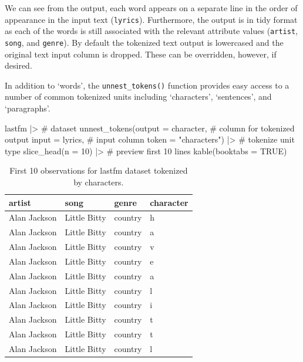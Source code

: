\documentclass[
  letterpaper,
]{latex/krantz}
\newenvironment{Shaded}{\begin{snugshade}}{\end{snugshade}}
\newcommand{\AttributeTok}[1]{\textcolor[rgb]{0.40,0.45,0.13}{#1}}
\newcommand{\CommentTok}[1]{\textcolor[rgb]{0.37,0.37,0.37}{#1}}
\newcommand{\ConstantTok}[1]{\textcolor[rgb]{0.56,0.35,0.01}{#1}}
\newcommand{\DecValTok}[1]{\textcolor[rgb]{0.68,0.00,0.00}{#1}}
\newcommand{\FunctionTok}[1]{\textcolor[rgb]{0.28,0.35,0.67}{#1}}
\newcommand{\NormalTok}[1]{\textcolor[rgb]{0.00,0.23,0.31}{#1}}
\newcommand{\SpecialCharTok}[1]{\textcolor[rgb]{0.37,0.37,0.37}{#1}}
\newcommand{\StringTok}[1]{\textcolor[rgb]{0.13,0.47,0.30}{#1}}
\begin{document}
We can see from the output, each word appears on a separate line in the
order of appearance in the input text (\texttt{lyrics}). Furthermore,
the output is in tidy format as each of the words is still associated
with the relevant attribute values (\texttt{artist}, \texttt{song}, and
\texttt{genre}). By default the tokenized text output is lowercased and
the original text input column is dropped. These can be overridden,
however, if desired.

In addition to `words', the \texttt{unnest\_tokens()} function provides
easy access to a number of common tokenized units including
`characters', `sentences', and `paragraphs'.

\begin{Shaded}
\begin{Highlighting}[]
\NormalTok{lastfm }\SpecialCharTok{|\textgreater{}} \CommentTok{\# dataset}
  \FunctionTok{unnest\_tokens}\NormalTok{(}\AttributeTok{output =}\NormalTok{ character, }\CommentTok{\# column for tokenized output}
                \AttributeTok{input =}\NormalTok{ lyrics, }\CommentTok{\# input column}
                \AttributeTok{token =} \StringTok{"characters"}\NormalTok{) }\SpecialCharTok{|\textgreater{}} \CommentTok{\# tokenize unit type}
  \FunctionTok{slice\_head}\NormalTok{(}\AttributeTok{n =} \DecValTok{10}\NormalTok{) }\SpecialCharTok{|\textgreater{}}  \CommentTok{\# preview first 10 lines}
  \FunctionTok{kable}\NormalTok{(}\AttributeTok{booktabs =} \ConstantTok{TRUE}\NormalTok{)}
\end{Highlighting}
\end{Shaded}

\hypertarget{tbl-td-lastfm-tokenize-characters}{}
\begin{table}
\caption{\label{tbl-td-lastfm-tokenize-characters}First 10 observations for lastfm dataset tokenized by characters. }\tabularnewline

\centering
\begin{tabular}{llll}
\toprule
artist & song & genre & character\\
\midrule
Alan Jackson & Little Bitty & country & h\\
Alan Jackson & Little Bitty & country & a\\
Alan Jackson & Little Bitty & country & v\\
Alan Jackson & Little Bitty & country & e\\
Alan Jackson & Little Bitty & country & a\\
\addlinespace
Alan Jackson & Little Bitty & country & l\\
Alan Jackson & Little Bitty & country & i\\
Alan Jackson & Little Bitty & country & t\\
Alan Jackson & Little Bitty & country & t\\
Alan Jackson & Little Bitty & country & l\\
\bottomrule
\end{tabular}
\end{table}
\end{document}
